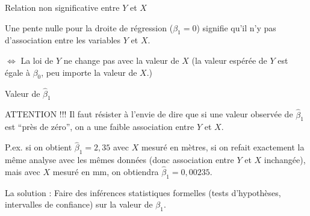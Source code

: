 \documentclass{BeamerTemplate}
\begin{document}
\begin{frame}[t]{Relation non significative entre $Y$ et $X$}

Une \alert{pente nulle pour la droite de régression ($\beta_1=0$) signifie qu'il n'y pas d'association entre les variables $Y$ et $X$}.
\medskip

$\Leftrightarrow$ La loi de $Y$ ne change pas avec la valeur de $X$ (la valeur espérée de $Y$ est égale à
$\beta_0$, peu importe la valeur de $X$.)


\begin{center}
\end{center}

\end{frame}

\begin{frame}[t]{Valeur de $\hat{\beta}_1$}

ATTENTION !!! Il faut résister à l'envie de dire que si
une valeur observée de $\hat{\beta}_1$ est ``près de zéro'',
on a une faible association entre $Y$ et $X$. 

P.ex. si on obtient $\hat{\beta}_1=2,35$
avec $X$ mesuré en mètres, si on refait exactement la même analyse avec
les mêmes données (donc association entre $Y$ et $X$ inchangée), mais avec $X$ mesuré en mm, on obtiendra $\hat{\beta}_1=0,00235$.

\medskip
La solution : Faire des inférences statistiques formelles (tests d'hypothèses, intervalles de confiance)
sur la valeur de $\beta_1$.
\end{frame}
\end{document}
